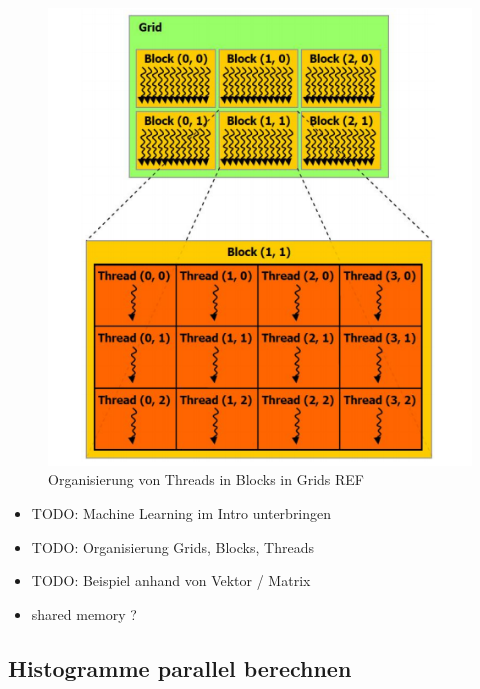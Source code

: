 \begin{figure}
	\centering
	\includegraphics[scale=0.55]{images/cuda1.png}
	\caption{Organisierung von Threads in Blocks in Grids REF}
	\label{img:cuda1}
\end{figure}

\begin{itemize}
	\item TODO: Machine Learning im Intro unterbringen
	\item TODO: Organisierung Grids, Blocks, Threads
	\item TODO: Beispiel anhand von Vektor / Matrix
	\item shared memory ?
\end{itemize}

\subsection{Histogramme parallel berechnen}

